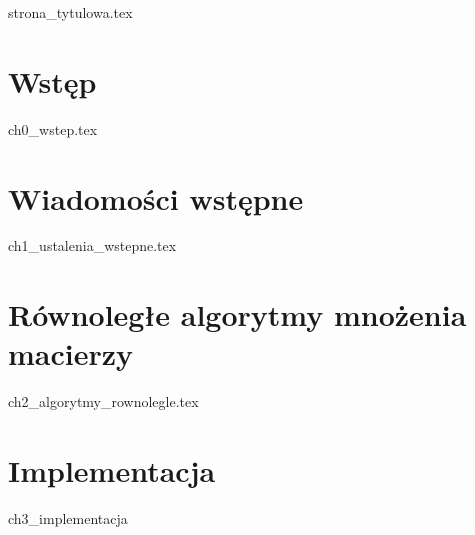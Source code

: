 \documentclass[a4paper,oneside,leqno,12pt]{book}
\begin{document}
{strona_tytulowa.tex}
\tableofcontents

\chapter{Wstęp}
{ch0_wstep.tex}

\chapter{Wiadomości wstępne}
{ch1_ustalenia_wstepne.tex}

\chapter{Równoległe algorytmy mnożenia macierzy}
{ch2_algorytmy_rownolegle.tex}

\chapter{Implementacja}
{ch3_implementacja}



\end{document}
